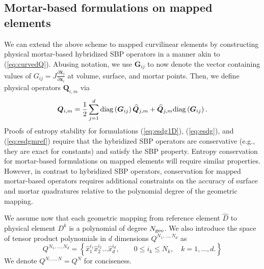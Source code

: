 \documentclass{svjour3}                     %
\renewcommand{\hat}{\widehat}
\newcommand{\diag}[1]{{\rm diag}\LRp{#1}}
\newcommand{\pd}[2]{\frac{\partial#1}{\partial#2}}
\newcommand{\LRp}[1]{\left( #1 \right)}
\newcommand{\LRc}[1]{\left\{ #1 \right\}}
\begin{document}
\subsection{Mortar-based formulations on mapped elements}

We can extend the above scheme to mapped curvilinear elements by constructing physical mortar-based hybridized SBP operators in a manner akin to (\ref{eq:curvedQ}).  Abusing notation, we use $\bm{G}_{ij}$ to now denote the vector containing values of $G_{ij} = J\pd{\hat{\bm{x}}_j}{\bm{x}_i}$ at volume, surface, and mortar points.  Then, we define physical operators $\bm{Q}_{i,m}$ via
\begin{equation}
\bm{Q}_{i,m} = \frac{1}{2}\sum_{j=1}^d \diag{\bm{G}_{ij}}\hat{\bm{Q}}_{j,m} + \hat{\bm{Q}}_{j,m} \diag{\bm{G}_{ij}}.
\label{eq:curvedQ_mortar}
\end{equation}
Proofs of entropy stability for formulations (\ref{eq:esdg1D}), (\ref{eq:esdg}), and (\ref{eq:esdgmref}) require that the hybridized SBP operators are conservative (e.g., they are exact for constants) and satisfy the SBP property.  Entropy conservation for mortar-based formulations on mapped elements will require similar properties.  However, in contrast to hybridized SBP operators, conservation for mapped mortar-based operators requires additional constraints on the accuracy of surface and mortar quadratures relative to the polynomial degree of the geometric mapping.  

We assume now that each geometric mapping from reference element $\hat{D}$ to physical element $D^k$ is a polynomial of degree $N_{\rm geo}$.  We also introduce the space of tensor product polynomials in $d$ dimensions $Q^{N_1,\ldots, N_d}$ as
\[
Q^{N_1,\ldots, N_d} = \LRc{ \hat{x}_1^{i_1}\hat{x}_2^{i_2}\ldots\hat{x}_d^{i_d}, \qquad 0\leq i_k \leq N_k, \quad k = 1,\ldots,d.}
\]
We denote $Q^{N,\ldots,N} = Q^N$ for conciseness.  
\end{document}

